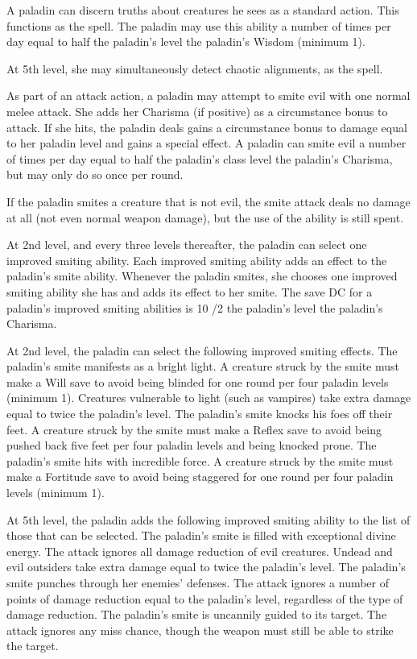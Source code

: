  A paladin can discern truths about creatures he sees as a standard action. This functions as the  spell. The paladin may use this ability a number of times per day equal to half the paladin's level \add the paladin's Wisdom (minimum 1).

At 5th level, she may simultaneously detect chaotic alignments, as the  spell.

 As part of an attack action, a paladin may attempt to smite evil with one normal melee attack. She adds her Charisma (if positive) as a circumstance bonus to attack. If she hits, the paladin deals gains a circumstance bonus to damage equal to her paladin level and gains a special effect.  A paladin can smite evil a number of times per day equal to half the paladin's class level \add the paladin's Charisma, but may only do so once per round.

If the paladin smites a creature that is not evil, the smite attack deals no damage at all (not even normal weapon damage), but the use of the ability is still spent.

 At 2nd level, and every three levels thereafter, the paladin can select one improved smiting ability. Each improved smiting ability adds an effect to the paladin's smite ability. Whenever the paladin smites, she chooses one improved smiting ability she has and adds its effect to her smite. The save DC for a paladin's improved smiting abilities is 10 /2 the paladin's level \add the paladin's Charisma.
\par At 2nd level, the paladin can select the following improved smiting effects.
 The paladin's smite manifests as a bright light. A creature struck by the smite must make a Will save to avoid being blinded for one round per four paladin levels (minimum 1). Creatures vulnerable to light (such as vampires) take extra damage equal to twice the paladin's level.
 The paladin's smite knocks his foes off their feet. A creature struck by the smite must make a Reflex save to avoid being pushed back five feet per four paladin levels and being knocked prone.
 The paladin's smite hits with incredible force. A creature struck by the smite must make a Fortitude save to avoid being staggered for one round per four paladin levels (minimum 1).

At 5th level, the paladin adds the following improved smiting ability to the list of those that can be selected.
 The paladin's smite is filled with exceptional divine energy. The attack ignores all damage reduction of evil creatures. Undead and evil outsiders take extra damage equal to twice the paladin's level.
 The paladin's smite punches through her enemies' defenses. The attack ignores a number of points of damage reduction equal to the paladin's level, regardless of the type of damage reduction.
 The paladin's smite is uncannily guided to its target. The attack ignores any miss chance, though the weapon must still be able to strike the target.

